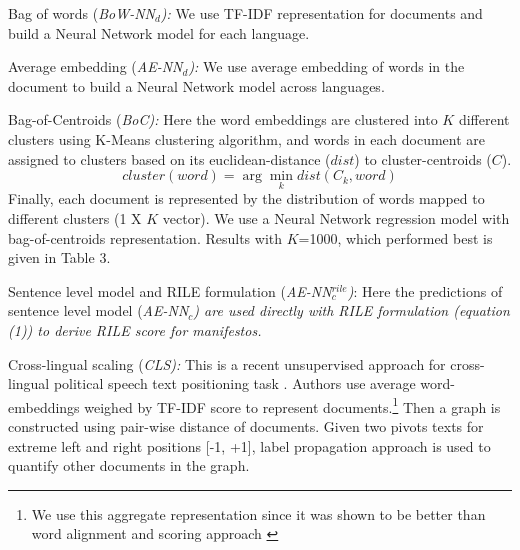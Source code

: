 \documentclass[11pt,a4paper]{article}
\newcommand{\argmin}{\arg\!\min}
\begin{document}
\begin{description}
\item{Bag of words (\em{BoW-NN$_{d}$}):} \rm We use TF-IDF representation for documents and build a Neural Network model  for each language.
\item{Average embedding (\em{AE-NN}$_{d}$):} We use average embedding of words in the document to build a Neural Network model across languages.

\item{Bag-of-Centroids (\em{BoC}):} Here the word embeddings are clustered into $K$ different clusters using K-Means clustering algorithm, and  words in each document are assigned to clusters based on its euclidean-distance ($dist$) to cluster-centroids ($C$). 
\[ cluster (word) = \argmin_k dist(C_{k}, word) \]
Finally, each document is represented by the distribution of words mapped to different clusters (1 X $K$ vector). We use a Neural Network regression model with bag-of-centroids representation. Results with $K$=1000, which performed best is given in Table 3.

\item{Sentence level model and RILE formulation (\em{AE-NN}$_{c}^{rile}$)}: Here the predictions of sentence level model (\em{AE-NN$_{c}$}) \rm are used directly with RILE formulation (equation (1)) to derive RILE score for manifestos.

\item{Cross-lingual scaling (\em{CLS}):} This is a recent unsupervised approach for cross-lingual political speech text positioning task \cite{EACL}. Authors use average word-embeddings weighed by TF-IDF score to represent documents.\footnote{We use this aggregate representation since it was shown to be better than word alignment and scoring approach \cite{EACL}} Then a graph is constructed using pair-wise distance of documents. Given two pivots texts for extreme left and right positions [-1, +1], label propagation approach is used to quantify other documents in the graph.
\end{description}
\end{document}
